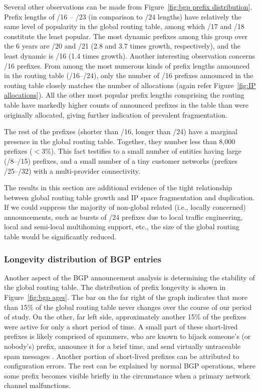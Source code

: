 Several other observations can be made from Figure~\ref{fig:bgp prefix
distribution}. Prefix lengths of /16 -- /23 (in comparison to /24 lengths)
have relatively the same level of popularity in the global routing table,
among which /17 and /18 constitute the least popular. The most dynamic
prefixes among this group over the 6 years are /20 and /21 (2.8 and 3.7 times
growth, respectively), and the least dynamic is /16 (1.4 times growth).
Another interesting observation concerns /16 prefixes. From among the most
numerous kinds of prefix lengths announced in the routing table (/16--/24),
only the number of /16 prefixes announced in the routing table closely matches
the number of allocations (again refer Figure~\ref{fig:IP allocations}). All
the other most popular prefix lengths comprising the routing table have
markedly higher counts of announced prefixes in the table than were originally
allocated, giving further indication of prevalent fragmentation.

The rest of the prefixes (shorter than /16, longer than /24) have a marginal
presence in the global routing table.  Together, they number less than 8,000
prefixes ($<$3\%). This fact testifies to a small number of entities having large
(/8--/15) prefixes, and a small number of a tiny customer networks (prefixes
/25--/32) with a multi-provider connectivity.

The results in this section are additional evidence of the tight relationship
between global routing table growth and IP space fragmentation and duplication.
If we could suppress the majority of non-global related (i.e., locally
concerned) announcements, such as bursts of /24 prefixes due to local traffic
engineering, local and semi-local multihoming support, etc., the size of the
global routing table would be significantly reduced.

\subsubsection{Longevity distribution of BGP entries}

Another aspect of the BGP announcement analysis is determining the stability of
the global routing table. The distribution of prefix longevity is shown in
Figure~\ref{fig:bgp ages}. The bar on the far right of the graph indicates that
more than 15\% of the global routing table never changes over the course of our
period of study. On the other, far left side, approximately another 15\% of the
prefixes
 were active for only a short period of time. A small part of these
short-lived prefixes is likely comprised of spammers, who are known to hijack
someone's (or nobody's) prefix, announce it for a brief time, and send
virtually untraceable spam messages
\cite{Ramachandran:2006:Understanding-the-network-level}. Another portion of
short-lived prefixes can be attributed to configuration errors. The rest can
be explained by normal BGP operations, where some prefix becomes visible
briefly in the circumstance when a primary network channel malfunctions.

